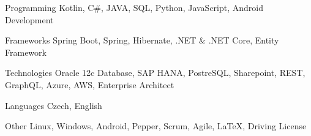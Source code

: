 


\begin{cvskills}


\cvskill
{Programming} %
{Kotlin, C\#, JAVA, SQL, Python, JavaScript, Android Development} %

\cvskill
{Frameworks}
{Spring Boot, Spring, Hibernate, .NET \& .NET Core, Entity Framework}

\cvskill
{Technologies}
{Oracle 12c Database, SAP HANA, PostreSQL, Sharepoint, REST, GraphQL, Azure, AWS, Enterprise Architect}

\cvskill
{Languages} %
{Czech, English} %

\cvskill
{Other}
{Linux, Windows, Android, Pepper, Scrum, Agile, LaTeX, Driving License}
\end{cvskills}